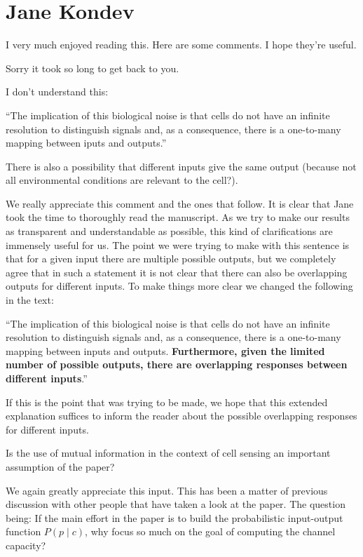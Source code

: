 \section{Jane Kondev}

I very much enjoyed reading this. Here are some comments. I hope they're useful.

Sorry it took so long to get back to you.

\begin{tcolorbox}
I don't understand this:

``The implication of this biological noise is that cells do not have an infinite
resolution to distinguish signals and, as a consequence, there is a one-to-many
mapping between iputs and outputs.''

There is also a possibility that different inputs give the same output (because
not all environmental conditions are relevant to the cell?).
\end{tcolorbox}

We really appreciate this comment and the ones that follow. It is clear that
Jane took the time to thoroughly read the manuscript. As we try to make our
results as transparent and understandable as possible, this kind of
clarifications are immensely useful for us. The point we were trying to make
with this sentence is that for a given input there are multiple possible
outputs, but we completely agree that in such a statement it is not clear that
there can also be overlapping outputs for different inputs. To make things more
clear we changed the following in the text:

``The implication of this biological noise is that cells do not have an infinite
resolution to distinguish signals and, as a consequence, there is a one-to-many
mapping between inputs and outputs. \textbf{Furthermore, given the limited
number of possible outputs, there are overlapping responses between different
inputs}.''

If this is the point that was trying to be made, we hope that this extended
explanation suffices to inform the reader about the possible overlapping
responses for different inputs.

\begin{tcolorbox}
Is the use of mutual information in the context of cell sensing an important
assumption of the paper?
\end{tcolorbox}

We again greatly appreciate this input. This has been a matter of previous
discussion with  other people that have taken a look at the paper. The question
being: If the main effort in the paper is to build the probabilistic
input-output function $P(p \mid c)$, why focus so much on the goal of computing
the channel capacity?

